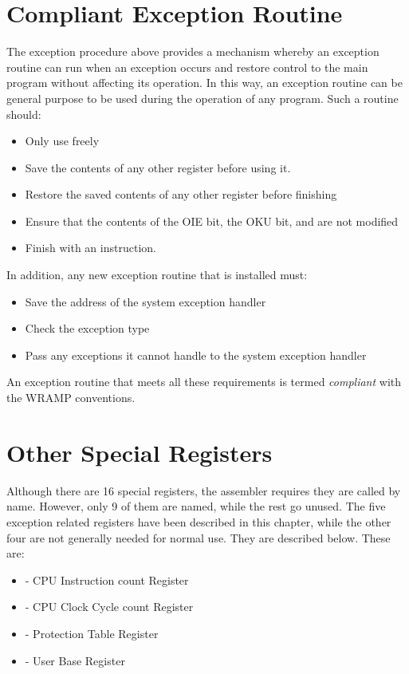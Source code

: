 \section{Compliant Exception Routine}

The exception procedure above provides a mechanism whereby an exception routine
can run when an exception occurs and restore control to the main program without
affecting its operation. In this way, an exception routine can be general
purpose to be used during the operation of any program. Such a routine should:

\begin{itemize}
\item Only use  freely
\item Save the contents of any other register before using it.
\item Restore the saved contents of any other register before finishing
\item Ensure that the contents of the OIE bit, the OKU bit,  and
 are not modified
\item Finish with an  instruction.
\end{itemize}

In addition, any new exception routine that is installed must:

\begin{itemize}
\item Save the address of the system exception handler
\item Check the exception type
\item Pass any exceptions it cannot handle to the system exception handler
\end{itemize}

An exception routine that meets all these requirements is termed {\em compliant}
with the WRAMP conventions.

\section{Other Special Registers}

Although there are 16 special registers, the assembler requires they
are called by name. However, only 9 of them are named, while the rest go unused.
The five exception related registers have been described in this chapter,
while the other four are not generally needed for normal use. They are described
below. These are:

\begin{itemize}
\item {} - CPU Instruction count Register
\item {} - CPU Clock Cycle count Register
\item {} - Protection Table Register
\item {} - User Base Register
\end{itemize}

